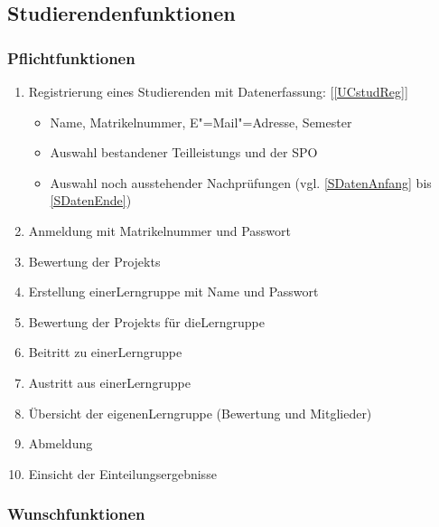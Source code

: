 \documentclass[parskip=full]{scrartcl}
\newcommand{\swtLabel}[1]{\textbf{/#1\arabic*0/}}
\newcommand{\testRef}[1]{[\ref{#1}]}
\begin{document}
\subsection{Studierendenfunktionen}

\subsubsection{Pflichtfunktionen}

\begin{enumerate}[label=\swtLabel{FA}]
  \item Registrierung eines Studierenden mit Datenerfassung: \testRef{UCstudReg}
  \label{FAregistrierung}
  \begin{itemize}
    \item Name, Matrikelnummer, E"=Mail"=Adresse, Semester
    \item Auswahl bestandener \glspl{Teilleistung} und der \gls{SPO}
    \item Auswahl noch ausstehender Nachprüfungen (vgl. \ref{SDatenAnfang} bis \ref{SDatenEnde})
  \end{itemize}
  \item Anmeldung mit Matrikelnummer und Passwort\label{FAStudanmeldung}
  \item Bewertung der \glspl{Projekt} \label{FAbewertung}
  \item Erstellung einer\gls{Lerngruppe} mit Name und Passwort \label{FAcreatelerng}
  \item Bewertung der \glspl{Projekt} für die\gls{Lerngruppe}  \label{FAbewertung2}
  \item Beitritt zu einer\gls{Lerngruppe} \label{FAjoinLerng}
  \item Austritt aus einer\gls{Lerngruppe} \label{FAlergAustritt}
  \item Übersicht der eigenen\gls{Lerngruppe} (Bewertung und Mitglieder)
  \label{FAcheckLerng}
  \item Abmeldung \label{FAStudabmeldung}
  \item Einsicht der Einteilungsergebnisse \label{FAStudeinsicht}
\end{enumerate}

\subsubsection{Wunschfunktionen}
\end{document}
